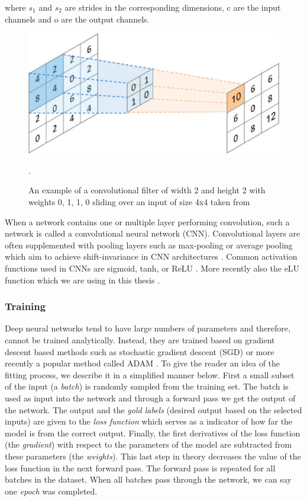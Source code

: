 where $s_1$ and $s_2$ are strides in the corresponding dimensions, c are the input channels and o are the output channels.

\begin{figure}[!htpb]
\centering
   \includegraphics[width=0.8\linewidth]{img/ch2/convolution.jpg}
   \caption[Convolutional filter]{An example of a convolutional filter of width 2 and height 2 with weights 0, 1, 1, 0 sliding over an input of size 4x4 taken from \cite{conv-diagram}}.
\end{figure}\label{fig:convolution}

When a network contains one or multiple layer performing convolution, such a network is called a convolutional neural network (CNN).
Convolutional layers are often supplemented with pooling layers such as max-pooling or average pooling which aim to achieve shift-invariance in CNN architectures \cite{cnn-description}. 
Common activation functions used in CNNs are sigmoid, tanh, or ReLU \cite{relu-paper}.
More recently also the eLU function which we are using in this thesis \cite{clevert-elu-2016}. \\

\subsubsection{Training}
Deep neural networks tend to have large numbers of parameters and therefore, cannot be trained analytically. Instead, they are trained based on gradient descent based methods such as stochastic gradient descent (SGD) \cite{} or more recently a popular method called ADAM \cite{kingma-adam-2017}. 
To give the reader an idea of the fitting process, we describe it in a simplified manner below. 
First a small subset of the input (a \textit{batch}) is randomly sampled from the training set. 
The batch is used as input into the network and through a forward pass we get the output of the network. 
The output and the \textit{gold labels} (desired output based on the selected inputs) are given to the \textit{loss function} which serves as a indicator of how far the model is from the correct output. 
Finally, the first derivatives of the loss function (the \textit{gradient}) with respect to the parameters of the model are subtracted from these parameters (the \textit{weights}).
This last step in theory decreases the value of the loss function in the next forward pass.
The forward pass is repeated for all batches in the dataset. When all batches pass through the network, we can say one \textit{epoch} was completed. 

